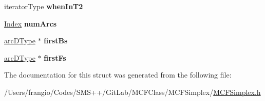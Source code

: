 \begin{DoxyCompactItemize}
iterator\+Type {\bfseries when\+In\+T2}
\item 
\mbox{\label{struct_m_c_f_simplex_1_1node_d_type_a3a0535000c17ee66dd23df542d33fdd9}} 
\mbox{\hyperlink{class_m_c_f_class_ad53d6229d7ec28555a9c9c2fd9abf773}{Index}} {\bfseries num\+Arcs}
\item 
\mbox{\label{struct_m_c_f_simplex_1_1node_d_type_aca5a4b52bbbfe6e44760b5b68eff6188}} 
\mbox{\hyperlink{struct_m_c_f_simplex_1_1arc_d_type}{arc\+D\+Type}} $\ast$ {\bfseries first\+Bs}
\item 
\mbox{\label{struct_m_c_f_simplex_1_1node_d_type_aac84543ed9ad5099fc0fcf1309bd994a}} 
\mbox{\hyperlink{struct_m_c_f_simplex_1_1arc_d_type}{arc\+D\+Type}} $\ast$ {\bfseries first\+Fs}
\end{DoxyCompactItemize}


The documentation for this struct was generated from the following file\+:\begin{DoxyCompactItemize}
\item 
/\+Users/frangio/\+Codes/\+S\+M\+S++/\+Git\+Lab/\+M\+C\+F\+Class/\+M\+C\+F\+Simplex/\mbox{\hyperlink{_m_c_f_simplex_8h}{M\+C\+F\+Simplex.\+h}}\end{DoxyCompactItemize}
